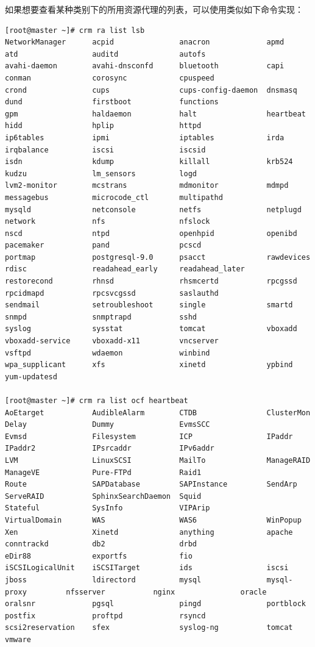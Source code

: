 如果想要查看某种类别下的所用资源代理的列表，可以使用类似如下命令实现：

\begin{verbatim}
[root@master ~]# crm ra list lsb
NetworkManager      acpid               anacron             apmd                atd                 auditd              autofs
avahi-daemon        avahi-dnsconfd      bluetooth           capi                conman              corosync            cpuspeed
crond               cups                cups-config-daemon  dnsmasq             dund                firstboot           functions
gpm                 haldaemon           halt                heartbeat           hidd                hplip               httpd
ip6tables           ipmi                iptables            irda                irqbalance          iscsi               iscsid
isdn                kdump               killall             krb524              kudzu               lm_sensors          logd
lvm2-monitor        mcstrans            mdmonitor           mdmpd               messagebus          microcode_ctl       multipathd
mysqld              netconsole          netfs               netplugd            network             nfs                 nfslock
nscd                ntpd                openhpid            openibd             pacemaker           pand                pcscd
portmap             postgresql-9.0      psacct              rawdevices          rdisc               readahead_early     readahead_later
restorecond         rhnsd               rhsmcertd           rpcgssd             rpcidmapd           rpcsvcgssd          saslauthd
sendmail            setroubleshoot      single              smartd              snmpd               snmptrapd           sshd
syslog              sysstat             tomcat              vboxadd             vboxadd-service     vboxadd-x11         vncserver
vsftpd              wdaemon             winbind             wpa_supplicant      xfs                 xinetd              ypbind
yum-updatesd

[root@master ~]# crm ra list ocf heartbeat
AoEtarget           AudibleAlarm        CTDB                ClusterMon          Delay               Dummy               EvmsSCC
Evmsd               Filesystem          ICP                 IPaddr              IPaddr2             IPsrcaddr           IPv6addr
LVM                 LinuxSCSI           MailTo              ManageRAID          ManageVE            Pure-FTPd           Raid1
Route               SAPDatabase         SAPInstance         SendArp             ServeRAID           SphinxSearchDaemon  Squid
Stateful            SysInfo             VIPArip             VirtualDomain       WAS                 WAS6                WinPopup
Xen                 Xinetd              anything            apache              conntrackd          db2                 drbd
eDir88              exportfs            fio                 iSCSILogicalUnit    iSCSITarget         ids                 iscsi
jboss               ldirectord          mysql               mysql-proxy         nfsserver           nginx               oracle
oralsnr             pgsql               pingd               portblock           postfix             proftpd             rsyncd
scsi2reservation    sfex                syslog-ng           tomcat              vmware 


\end{verbatim}
